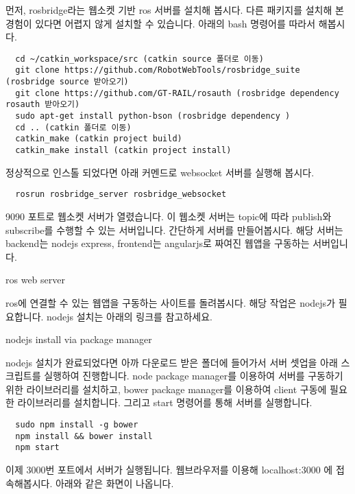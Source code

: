 \documentclass[11pt,fleqn]{book} %
\begin{document}
먼저, rosbridge라는 웹소켓 기반 ros 서버를 설치해 봅시다. 다른 패키지를 설치해 본 경험이 있다면 어렵지 않게 설치할 수 있습니다.
아래의 bash 명령어를 따라서 해봅시다.

\begin{verbatim}
  cd ~/catkin_workspace/src (catkin source 폴더로 이동)
  git clone https://github.com/RobotWebTools/rosbridge_suite (rosbridge source 받아오기)
  git clone https://github.com/GT-RAIL/rosauth (rosbridge dependency rosauth 받아오기)
  sudo apt-get install python-bson (rosbridge dependency )
  cd .. (catkin 폴더로 이동)
  catkin_make (catkin project build)
  catkin_make install (catkin project install)
\end{verbatim}

정상적으로 인스톨 되었다면 아래 커멘드로 websocket 서버를 실행해 봅시다.

\begin{verbatim}
  rosrun rosbridge_server rosbridge_websocket
\end{verbatim}

9090 포트로 웹소켓 서버가 열렸습니다. 이 웹소켓 서버는 topic에 따라 publish와 subscribe를 수행할 수 있는 서버입니다.
간단하게 서버를 만들어봅시다. 해당 서버는 backend는 nodejs express, frontend는 angularjs로 짜여진 웹앱을 구동하는 서버입니다.

\begin{link}
  ros web server
\end{link}

ros에 연결할 수 있는 웹앱을 구동하는 사이트를 돌려봅시다. 해당 작업은 nodejs가 필요합니다.
nodejs 설치는 아래의 링크를 참고하세요.

\begin{link}
  nodejs install via package manager
\end{link}

nodejs 설치가 완료되었다면 아까 다운로드 받은 폴더에 들어가서 서버 셋업을 아래 스크립트를 실행하여 진행합니다.
node package manager를 이용하여 서버를 구동하기 위한 라이브러리를 설치하고, bower package manager를 이용하여
client 구동에 필요한 라이브러리를 설치합니다. 그리고 start 명령어를 통해 서버를 실행합니다.

\begin{verbatim}
  sudo npm install -g bower
  npm install && bower install
  npm start
\end{verbatim}

이제 3000번 포트에서 서버가 실행됩니다. 웹브라우저를 이용해 localhost:3000 에 접속해봅시다.
아래와 같은 화면이 나옵니다.
\end{document}
